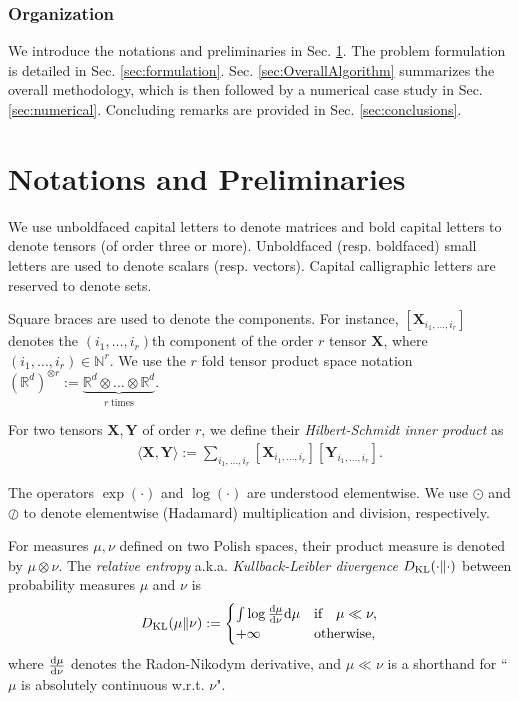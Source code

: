 \documentclass[letterpaper, 10pt, twocolumn]{ieeeconf}      %
\newcommand{\differential}{{\rm{d}}}
\begin{document}
\subsubsection*{Organization} We introduce the notations and preliminaries in Sec. \ref{secNotationsAndPrelim}. The problem formulation is detailed in Sec. \ref{sec:formulation}. Sec. \ref{sec:OverallAlgorithm} summarizes the overall methodology, which is then followed by a numerical case study in Sec. \ref{sec:numerical}. Concluding remarks are provided in Sec. \ref{sec:conclusions}. 



\section{Notations and Preliminaries}\label{secNotationsAndPrelim} 
\noindent We use unboldfaced capital letters to denote matrices and bold capital letters to denote tensors (of order three or more). Unboldfaced (resp. boldfaced) small letters are used to denote scalars (resp. vectors). Capital calligraphic letters are reserved to denote sets.

Square braces are used to denote the components. For instance, $\left[\bm{X}_{i_{1},\hdots,i_{r}}\right]$ denotes the $(i_1,\hdots,i_{r})$th component of the order $r$ tensor $\bm{X}$, where $(i_1,\hdots,i_{r})\in\mathbb{N}^{r}$. We use the $r$ fold tensor product space notation $\left(\mathbb{R}^{d}\right)^{\otimes r} := \underbrace{\mathbb{R}^{d} \otimes \hdots \otimes\mathbb{R}^{d}}_{r\;\text{times}}$. 

For two tensors $\bm{X},\bm{Y}$ of order $r$, we define their \emph{Hilbert-Schmidt inner product} as
\begin{align}
\langle\bm{X},\bm{Y}\rangle := \sum_{i_1,\hdots,i_r}\left[\bm{X}_{i_{1},\hdots,i_{r}}\right]\left[\bm{Y}_{i_{1},\hdots,i_{r}}\right].
\label{HilbertSchmidtInnerProdTensors}
\end{align}

The operators $\exp(\cdot)$ and $\log(\cdot)$ are understood elementwise. We use $\odot$ and $\oslash$ to denote elementwise (Hadamard) multiplication and division, respectively. 

For measures $\mu,\nu$ defined on two Polish spaces, their product measure is denoted by $\mu \otimes \nu$. The \emph{relative entropy} a.k.a. \emph{Kullback-Leibler divergence} $D_{\rm{KL}}(\cdot\Vert\cdot)$ between probability measures $\mu$ and $\nu$ is
\begin{align}
D_{\rm{KL}}(\mu\Vert\nu):=\begin{cases}
\int \log\frac{\differential\mu}{\differential\nu}\differential\mu & \text{if}\quad\mu \ll \nu,\\
+\infty &\text{otherwise,}
\end{cases}
\label{DefKLdivergence}
\end{align}
where $\frac{\differential\mu}{\differential\nu}$ denotes the Radon-Nikodym derivative, and $\mu \ll \nu$ is a shorthand for ``$\mu$ is absolutely continuous w.r.t. $\nu$".
\end{document}
